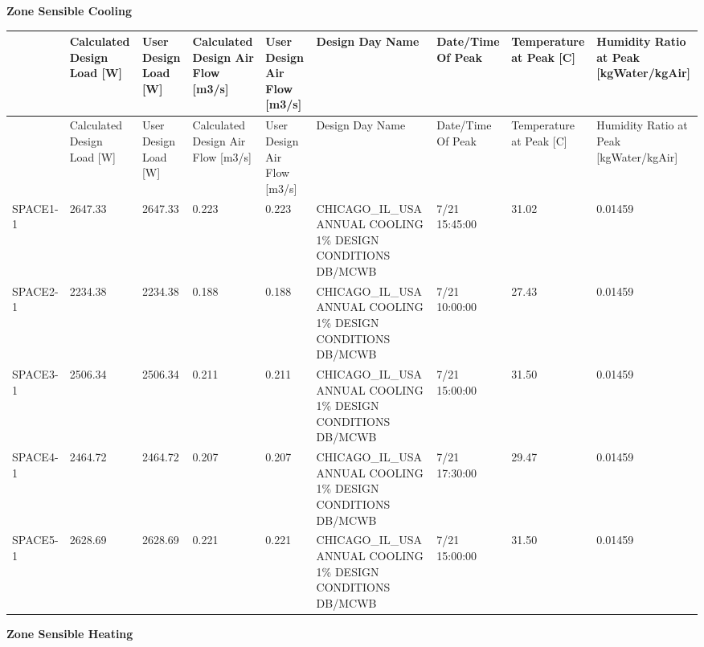 \textbf{Zone Sensible Cooling}

{\scriptsize
\begin{longtable}[c]{>{\raggedright}p{0.66in}>{\raggedright}p{0.66in}>{\raggedright}p{0.66in}>{\raggedright}p{0.66in}>{\raggedright}p{0.66in}>{\raggedright}p{0.66in}>{\raggedright}p{0.66in}>{\raggedright}p{0.66in}>{\raggedright}p{0.66in}}
\toprule 
 & Calculated Design Load [W] & User Design Load [W] & Calculated Design Air Flow [m3/s] & User Design Air Flow [m3/s] & Design Day Name & Date/Time Of Peak & Temperature at Peak [C] & Humidity Ratio at Peak [kgWater/kgAir] \tabularnewline
\midrule
\endfirsthead

\toprule 
 & Calculated Design Load [W] & User Design Load [W] & Calculated Design Air Flow [m3/s] & User Design Air Flow [m3/s] & Design Day Name & Date/Time Of Peak & Temperature at Peak [C] & Humidity Ratio at Peak [kgWater/kgAir] \tabularnewline
\midrule
\endhead

SPACE1-1 & 2647.33 & 2647.33 & 0.223 & 0.223 & CHICAGO\-\_IL\-\_USA ANNUAL COOLING 1\% DESIGN CONDITIONS DB/MCWB & 7/21 15:45:00 & 31.02 & 0.01459 \tabularnewline
SPACE2-1 & 2234.38 & 2234.38 & 0.188 & 0.188 & CHICAGO\-\_IL\-\_USA ANNUAL COOLING 1\% DESIGN CONDITIONS DB/MCWB & 7/21 10:00:00 & 27.43 & 0.01459 \tabularnewline
SPACE3-1 & 2506.34 & 2506.34 & 0.211 & 0.211 & CHICAGO\-\_IL\-\_USA ANNUAL COOLING 1\% DESIGN CONDITIONS DB/MCWB & 7/21 15:00:00 & 31.50 & 0.01459 \tabularnewline
SPACE4-1 & 2464.72 & 2464.72 & 0.207 & 0.207 & CHICAGO\-\_IL\-\_USA ANNUAL COOLING 1\% DESIGN CONDITIONS DB/MCWB & 7/21 17:30:00 & 29.47 & 0.01459 \tabularnewline
SPACE5-1 & 2628.69 & 2628.69 & 0.221 & 0.221 & CHICAGO\-\_IL\-\_USA ANNUAL COOLING 1\% DESIGN CONDITIONS DB/MCWB & 7/21 15:00:00 & 31.50 & 0.01459 \tabularnewline
\bottomrule
\end{longtable}}

\textbf{Zone Sensible Heating}


